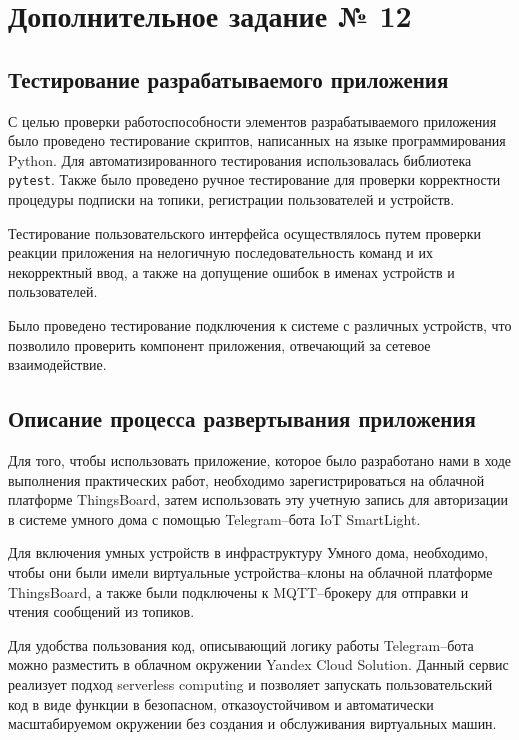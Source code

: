 \documentclass[a4paper,14pt]{extarticle}
\begin{document}
\section{Дополнительное задание № 12}

\subsection{Тестирование разрабатываемого приложения}
С целью проверки работоспособности элементов разрабатываемого приложения было проведено тестирование скриптов, написанных на языке программирования Python. Для автоматизированного тестирования использовалась библиотека \texttt{pytest}. Также было проведено ручное тестирование для проверки корректности процедуры подписки на топики, регистрации пользователей и устройств. 

Тестирование пользовательского интерфейса осуществлялось путем проверки реакции приложения на нелогичную последовательность команд и их некорректный ввод, а также на допущение ошибок в именах устройств и пользователей. 

Было проведено тестирование подключения к системе с различных устройств, что позволило проверить компонент приложения, отвечающий за сетевое взаимодействие.

\subsection{Описание процесса развертывания приложения}

Для того, чтобы использовать приложение, которое было разработано нами в ходе выполнения практических работ, необходимо зарегистрироваться на  облачной платформе ThingsBoard, затем использовать эту учетную запись для авторизации в системе умного дома с помощью \mbox{Telegram--бота} IoT SmartLight. 

Для включения умных устройств в инфраструктуру Умного дома, необходимо, чтобы они были имели виртуальные \mbox{устройства--клоны} на облачной платформе ThingsBoard, а также были подключены к \mbox{MQTT--брокеру} для отправки и чтения сообщений из топиков.

Для удобства пользования код, описывающий логику работы \mbox{Telegram--бота} можно разместить в облачном окружении Yandex Cloud Solution. Данный сервис реализует подход serverless computing и позволяет запускать пользовательский код в виде функции в безопасном, отказоустойчивом и автоматически масштабируемом окружении без создания и обслуживания виртуальных машин.
\end{document}
